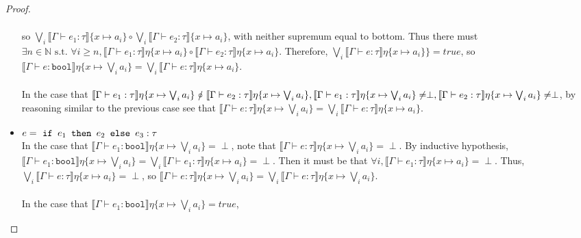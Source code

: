 \begin{proof}
\begin{itemize}
\begin{align*}
  \end{align*}
  so $\bigvee_i\llbracket \Gamma \vdash e_1 : \tau \rrbracket\{x\mapsto a_i\} 
  \circ \bigvee_i\llbracket \Gamma \vdash e_2 : \tau \rrbracket\{x\mapsto a_i\}$, with neither supremum equal to bottom. Thus there must $\exists n \in \mathbb{N} \text{ s.t. } \forall i \geq n, \llbracket \Gamma \vdash e_1 : \tau \rrbracket\eta\{x\mapsto   a_i\} \circ
  \llbracket \Gamma \vdash e_2 : \tau \rrbracket\eta\{x\mapsto   a_i\}$. Therefore, $\bigvee_i\llbracket \Gamma \vdash e : \tau \rrbracket\eta\{x\mapsto  a_i\}\} = true$, so $\llbracket \Gamma \vdash e : \texttt{bool}\rrbracket\eta\{x\mapsto \bigvee_i a_i\} 
  = \bigvee_i\llbracket \Gamma \vdash e : \tau \rrbracket\eta\{x\mapsto  a_i\}$. \\ \\
 In the case that $\llbracket \Gamma \vdash e_1 : \tau \rrbracket\eta\{x\mapsto  \bigvee_i a_i\} \ \slashed{\circ} \ \llbracket \Gamma \vdash e_2 : \tau\rrbracket\eta\{x\mapsto  \bigvee_i a_i\}, \ \\
 \llbracket \Gamma \vdash e_1 : \tau \rrbracket\eta\{x\mapsto  \bigvee_i a_i\} \neq \perp, 
 \llbracket \Gamma \vdash e_2 : \tau \rrbracket\eta\{x\mapsto  \bigvee_i a_i\} \neq \perp$, by reasoning similar to the previous case see that $\llbracket \Gamma \vdash e : \tau \rrbracket\eta\{x\mapsto  \bigvee_i a_i\} = 
 \bigvee_i\llbracket \Gamma \vdash e : \tau \rrbracket\eta\{x\mapsto  a_i\}$.
 \item $e = \ \texttt{if } e_1 \texttt{ then } e_2 \texttt{ else } e_3 : \tau$ \\ 
In the case that $\llbracket \Gamma \vdash e_1 : \texttt{bool} \rrbracket\eta\{x\mapsto  \bigvee_i a_i\} = \perp$, note that $\llbracket \Gamma \vdash e : 
\tau \rrbracket\eta\{x\mapsto  \bigvee_i a_i\} =  \perp$. By inductive hypothesis, 
$\llbracket \Gamma \vdash e_1 : \texttt{bool} \rrbracket\eta\{x\mapsto  \bigvee_i a_i\} = 
\bigvee_i\llbracket \Gamma \vdash e_1 : \tau \rrbracket\eta\{x\mapsto a_i\} = \perp$. 
Then it must be that
$\forall i, \llbracket \Gamma \vdash e_1 : \tau \rrbracket\eta\{x\mapsto a_i\} = \perp$. 
Thus, $\bigvee_i\llbracket \Gamma \vdash e : \tau \rrbracket\eta\{x\mapsto  a_i\} = \perp$, so 
$\llbracket \Gamma \vdash e : \tau \rrbracket\eta\{x\mapsto  \bigvee_i a_i\} = 
\bigvee_i\llbracket \Gamma \vdash e : \tau \rrbracket\eta\{x\mapsto  \bigvee_i a_i\}$. \\ \\
%
In the case that $\llbracket \Gamma \vdash e_1 : \texttt{bool} \rrbracket\eta\{x\mapsto  \bigvee_i a_i\} = true$, 

\end{itemize}
\end{proof}
